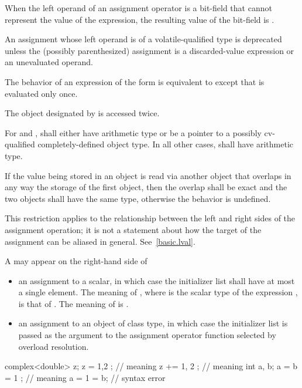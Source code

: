 \pnum
{}%
When the left operand of an assignment operator
is a bit-field that cannot represent the value of the expression, the
resulting value of the bit-field is
.

\pnum
An assignment whose left operand is of
a volatile-qualified type is deprecated
unless the (possibly parenthesized) assignment is a discarded-value expression or
an unevaluated operand.

\pnum
The behavior of an expression of the form 
is equivalent to  except
that  is evaluated only once.
\begin{note}
The object designated by  is accessed twice.
\end{note}
For \tcode{+=} and \tcode{-=},
 shall either have arithmetic type or be a pointer to a
possibly cv-qualified completely-defined object type. In all other
cases,  shall have arithmetic type.

\pnum
If the value being stored in an object is read via another object that
overlaps in any way the storage of the first object, then the overlap shall be
exact and the two objects shall have the same type, otherwise the behavior is
undefined.
\begin{note}
This restriction applies to the relationship
between the left and right sides of the assignment operation; it is not a
statement about how the target of the assignment can be aliased in general.
See~\ref{basic.lval}.
\end{note}

\pnum
A  may appear on the right-hand side of
\begin{itemize}
\item an assignment to a scalar, in which case the initializer list shall have
at most a single element. The meaning of , where  is the
scalar type of the expression , is that of . The meaning of
 is .

\item an assignment to an object of class type, in which case the initializer
list is passed as the argument to the assignment operator function selected by
overload resolution.
\end{itemize}
\begin{example}
\begin{codeblock}
complex<double> z;
z = { 1,2 };        // meaning 
z += { 1, 2 };      // meaning 
int a, b;
a = b = { 1 };      // meaning 
a = { 1 } = b;      // syntax error
\end{codeblock}
\end{example}

